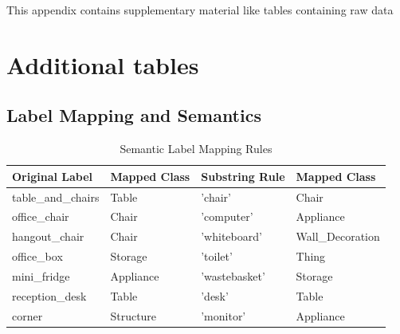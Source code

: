 %

This appendix contains supplementary material like tables containing raw data

\section{Additional tables}\label{app:tables}

\subsection{Label Mapping and Semantics}\label{app:semantics}

\begin{table}[H]
\centering
\caption{Semantic Label Mapping Rules}
\label{tab:label_mapping}
\begin{tabular}{ll | ll}
\toprule
\textbf{Original Label} & \textbf{Mapped Class} & \textbf{Substring Rule} & \textbf{Mapped Class} \\ \midrule
table\_and\_chairs      & Table                 & 'chair'                 & Chair                 \\
office\_chair           & Chair                 & 'computer'              & Appliance             \\
hangout\_chair          & Chair                 & 'whiteboard'            & Wall\_Decoration      \\
office\_box             & Storage               & 'toilet'                & Thing                 \\
mini\_fridge            & Appliance             & 'wastebasket'           & Storage               \\
reception\_desk         & Table                 & 'desk'                  & Table                 \\
corner                  & Structure             & 'monitor'               & Appliance             \\ 
\bottomrule
\end{tabular}
\end{table}


